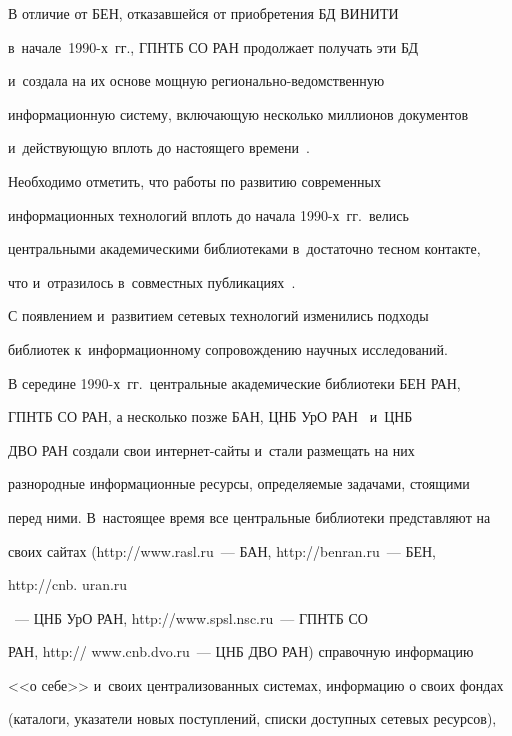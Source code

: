   


  В отличие от БЕН, отказавшейся от приобретения БД ВИНИТИ 


в~начале~1990-х~гг., ГПНТБ СО РАН продолжает получать эти БД 


и~создала на их основе мощную ре\-гио\-наль\-но-ве\-дом\-ст\-вен\-ную 


информационную систему, включающую несколько миллионов документов 


и~действующую вплоть до настоящего времени~\cite{12-vla, 13-vla}. 


  


  Необходимо отметить, что работы по развитию современных 


информационных технологий вплоть до начала 1990-х~гг.\ велись 


центральными академическими библиотеками в~достаточно тесном контакте, 


что и~отразилось в~совместных публикациях~\cite{14-vla, 15-vla}.


  


  С появлением и~развитием сетевых технологий изменились подходы 


библиотек к~информационному сопровождению научных исследований. 


  


  В середине 1990-х~гг.\ центральные академические библиотеки БЕН РАН, 


ГПНТБ СО РАН, а несколько позже БАН, ЦНБ УрО РАН~\cite{16-vla} и~ЦНБ 


ДВО РАН создали свои ин\-тер\-нет-сай\-ты и~стали размещать на них 


разнородные информационные ресурсы, определяемые задачами, стоящими 


перед ними. В~настоящее время все центральные библиотеки представляют на 


своих сайтах ({\sf http://www.rasl.ru}~--- БАН, {\sf http://benran.ru}~--- БЕН, {\sf 


http://cnb. uran.ru}~--- ЦНБ УрО РАН, {\sf http://www.spsl.nsc.ru}~--- ГПНТБ СО 


РАН, {\sf http:// www.cnb.dvo.ru}~--- ЦНБ ДВО РАН) справочную информацию 


<<о себе>> и~своих централизованных системах, информацию о своих фондах 


(каталоги, указатели новых поступлений, списки доступных сетевых ресурсов), 


